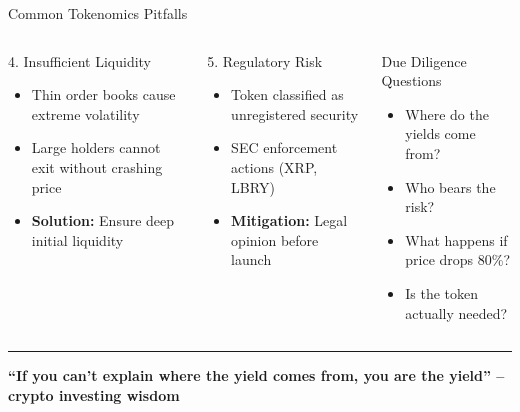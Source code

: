 \documentclass[8pt,aspectratio=169]{beamer}
\newcommand{\bottomnote}[1]{\vfill\vspace{-2mm}\textcolor{mllavender2}{\rule{\textwidth}{0.4pt}}\vspace{1mm}\footnotesize\textbf{#1}}
\begin{document}
\begin{frame}{Common Tokenomics Pitfalls}
\begin{columns}[T]
\begin{alertblock}{\footnotesize 4. Insufficient Liquidity}
\footnotesize
\begin{itemize}
  \item Thin order books cause extreme volatility
  \item Large holders cannot exit without crashing price
  \item \textbf{Solution:} Ensure deep initial liquidity
\end{itemize}
\end{alertblock}
\vspace{1mm}
\begin{alertblock}{\footnotesize 5. Regulatory Risk}
\footnotesize
\begin{itemize}
  \item Token classified as unregistered security
  \item SEC enforcement actions (XRP, LBRY)
  \item \textbf{Mitigation:} Legal opinion before launch
\end{itemize}
\end{alertblock}
\vspace{1mm}
\begin{exampleblock}{\footnotesize Due Diligence Questions}
\footnotesize
\begin{itemize}
  \item Where do the yields come from?
  \item Who bears the risk?
  \item What happens if price drops 80\%?
  \item Is the token actually needed?
\end{itemize}
\end{exampleblock}
\end{columns}
\bottomnote{``If you can't explain where the yield comes from, you are the yield'' -- crypto investing wisdom}
\end{frame}
\end{document}
